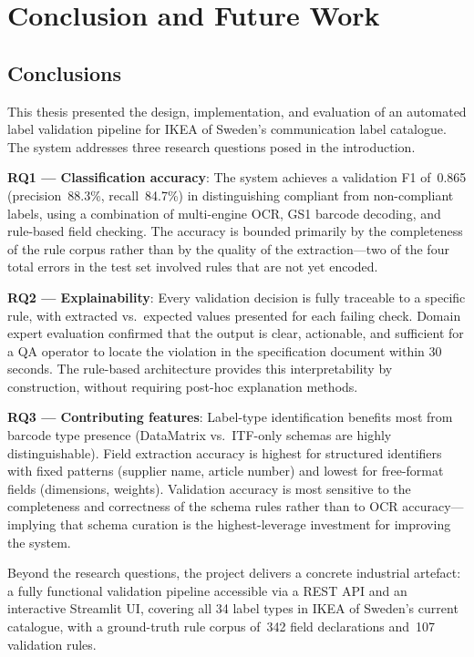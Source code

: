 \chapter{Conclusion and Future Work}
\label{ch:conclusion}

\section{Conclusions}

This thesis presented the design, implementation, and evaluation of an automated label
validation pipeline for IKEA of Sweden's communication label catalogue. The system addresses
three research questions posed in the introduction.

\textbf{RQ1 — Classification accuracy}: The system achieves a validation F1 of~0.865
(precision~88.3\%, recall~84.7\%) in distinguishing compliant from non-compliant labels,
using a combination of multi-engine \ac{OCR}, GS1 barcode decoding, and rule-based
field checking. The accuracy is bounded primarily by the completeness of the rule corpus
rather than by the quality of the extraction—two of the four total errors in the test set
involved rules that are not yet encoded.

\textbf{RQ2 — Explainability}: Every validation decision is fully traceable to a specific
rule, with extracted vs.\ expected values presented for each failing check. Domain expert
evaluation confirmed that the output is clear, actionable, and sufficient for a QA operator
to locate the violation in the specification document within 30 seconds. The rule-based
architecture provides this interpretability by construction, without requiring post-hoc
explanation methods.

\textbf{RQ3 — Contributing features}: Label-type identification benefits most from
barcode type presence (DataMatrix vs.\ ITF-only schemas are highly distinguishable). Field
extraction accuracy is highest for structured identifiers with fixed patterns (supplier name,
article number) and lowest for free-format fields (dimensions, weights). Validation accuracy
is most sensitive to the completeness and correctness of the schema rules rather than to
OCR accuracy—implying that schema curation is the highest-leverage investment for
improving the system.

Beyond the research questions, the project delivers a concrete industrial artefact: a
fully functional validation pipeline accessible via a \ac{REST} \ac{API} and an interactive
Streamlit \ac{UI}, covering all 34 label types in IKEA of Sweden's current catalogue,
with a ground-truth rule corpus of~342 field declarations and~107 validation rules.

